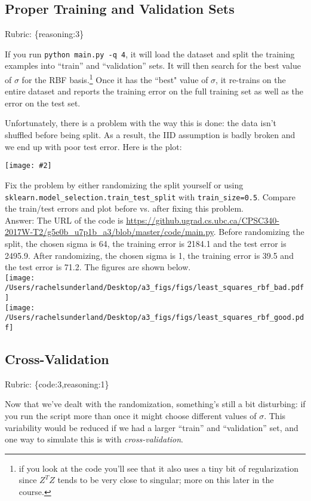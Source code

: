 \documentclass{article}
\def\rubric#1{\gre{Rubric: \{#1\}}}{}
\def\blu#1{{\color{blu}#1}}
\def\gre#1{{\color{gre}#1}}
\newcommand{\centerfig}[2]{\begin{center}\texttt{[image: \#2]}\end{center}}
\begin{document}
\subsection{Proper Training and Validation Sets}
\rubric{reasoning:3}

If you run \verb|python main.py -q 4|, it will load the dataset and split the training examples
 into ``train'' and ``validation'' sets. It will then search for the best value of $\sigma$
 for the RBF basis.\footnote{if you look at the code you'll see that it also uses a tiny bit of regularization since $Z^TZ$ tends to be very close to singular; more on this later in the course.}
  Once it has the ``best" value of $\sigma$, it re-trains on the entire dataset and reports the
  training error on the full training set as well as the error on the test set.

Unfortunately, there is a problem with the way this is done: the data isn't shuffled before being split.
As a result, the IID assumption is badly broken and we end up with poor test error. Here is the plot:

\centerfig{.7}{/Users/rachelsunderland/Desktop/a3_figs/figs/least_squares_rbf_bad.pdf}


\blu{Fix the problem by either randomizing the split yourself or using \texttt{sklearn.model\_selection.train\_test\_split} with \texttt{train\_size=0.5}. Compare the train/test errors and plot before vs. after fixing this problem.}
\textcolor{gre}{\\Answer: The URL of the code is \url{https://github.ugrad.cs.ubc.ca/CPSC340-2017W-T2/g5e0b_u7p1b_a3/blob/master/code/main.py}. Before randomizing the split, the chosen sigma is 64, the training error is 2184.1 and the test error is 2495.9. After randomizing, the chosen sigma is 1, the training error is 39.5 and the test error is 71.2.
The figures are shown below.}
\\ \texttt{[image: /Users/rachelsunderland/Desktop/a3\_figs/figs/least\_squares\_rbf\_bad.pdf]}\\
\texttt{[image: /Users/rachelsunderland/Desktop/a3\_figs/figs/least\_squares\_rbf\_good.pdf]}

\subsection{Cross-Validation}
\rubric{code:3,reasoning:1}

Now that we've dealt with the randomization, something's still a bit disturbing:
if you run the script more than once it might choose different values of $\sigma$.
This variability would be reduced if we
had a larger ``train'' and ``validation'' set, and one way to simulate this is
with \emph{cross-validation}.
\end{document}
